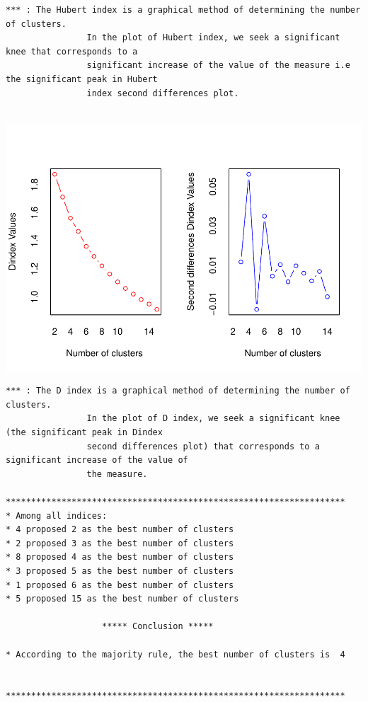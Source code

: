 \documentclass[
]{article}
\begin{document}
\begin{verbatim}
*** : The Hubert index is a graphical method of determining the number of clusters.
                In the plot of Hubert index, we seek a significant knee that corresponds to a 
                significant increase of the value of the measure i.e the significant peak in Hubert
                index second differences plot. 
 
\end{verbatim}

\includegraphics{Projet_files/figure-latex/unnamed-chunk-34-2.pdf}

\begin{verbatim}
*** : The D index is a graphical method of determining the number of clusters. 
                In the plot of D index, we seek a significant knee (the significant peak in Dindex
                second differences plot) that corresponds to a significant increase of the value of
                the measure. 
 
******************************************************************* 
* Among all indices:                                                
* 4 proposed 2 as the best number of clusters 
* 2 proposed 3 as the best number of clusters 
* 8 proposed 4 as the best number of clusters 
* 3 proposed 5 as the best number of clusters 
* 1 proposed 6 as the best number of clusters 
* 5 proposed 15 as the best number of clusters 

                   ***** Conclusion *****                            
 
* According to the majority rule, the best number of clusters is  4 
 
 
******************************************************************* 
\end{verbatim}
\end{document}
